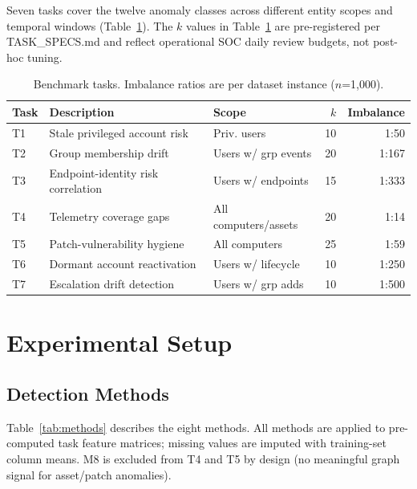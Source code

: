 \documentclass[conference]{IEEEtran}
\begin{document}
Seven tasks cover the twelve anomaly classes across different entity scopes and
temporal windows (Table~\ref{tab:tasks}). The $k$ values in Table~\ref{tab:tasks}
are pre-registered per TASK\_SPECS.md and reflect operational SOC daily review
budgets, not post-hoc tuning.

\begin{table}[t]
\centering
\caption{Benchmark tasks. Imbalance ratios are per dataset instance ($n$=1,000).}
\label{tab:tasks}
\scriptsize
\begin{tabular}{@{}lllrr@{}}
\toprule
Task & Description & Scope & $k$ & Imbalance \\
\midrule
T1 & Stale privileged account risk      & Priv. users        & 10 & 1:50  \\
T2 & Group membership drift             & Users w/ grp events & 20 & 1:167 \\
T3 & Endpoint-identity risk correlation & Users w/ endpoints  & 15 & 1:333 \\
T4 & Telemetry coverage gaps            & All computers/assets & 20 & 1:14  \\
T5 & Patch-vulnerability hygiene       & All computers       & 25 & 1:59  \\
T6 & Dormant account reactivation       & Users w/ lifecycle  & 10 & 1:250 \\
T7 & Escalation drift detection         & Users w/ grp adds   & 10 & 1:500 \\
\bottomrule
\end{tabular}
\end{table}

\section{Experimental Setup}
\label{sec:setup}

\subsection{Detection Methods}

Table~\ref{tab:methods} describes the eight methods. All methods are applied to
pre-computed task feature matrices; missing values are imputed with training-set
column means. M8 is excluded from T4 and T5 by design (no meaningful graph signal
for asset/patch anomalies).
\end{document}
